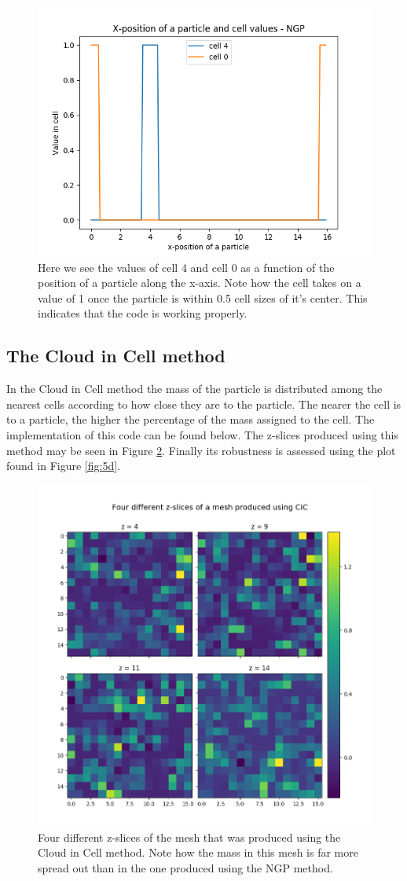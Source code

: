 \documentclass[a4paper,10pt]{article}
\begin{document}
\begin{figure}[h!]
  \centering
  \includegraphics[width=0.7\linewidth]{./plots/5b.png}
  \caption{Here we see the values of cell 4 and cell 0 as a function of the position of a particle along the x-axis. Note how the cell takes on a value of 1 once the particle is within 0.5 cell sizes of it's center. This indicates that the code is working properly.}
  \label{fig:5b}
\end{figure}

\subsection{The Cloud in Cell method}

In the Cloud in Cell method the mass of the particle is distributed among the nearest cells according to how close they are to the particle. The nearer the cell is to a particle, the higher the percentage of the mass assigned to the cell. The implementation of this code can be found below. The z-slices produced using this method may be seen in Figure \ref{fig:5c}. Finally its robustness is assessed using the plot found in Figure \ref{fig:5d}. 

\begin{figure}[h!]
  \centering
  \includegraphics[width=0.7\linewidth]{./plots/5c.png}
  \caption{Four different z-slices of the mesh that was produced using the Cloud in Cell method. Note how the mass in this mesh is far more spread out than in the one produced using the NGP method.}
  \label{fig:5c}
\end{figure}
\end{document}
